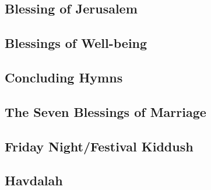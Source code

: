 ﻿\documentclass[a5paper, 12pt]{Birchon}
\begin{document}
\begin{english}
\subsection*{Blessing of Jerusalem}
\end{english}

\begin{english}
\subsection*{Blessings of Well-being}
\end{english}

\begin{english}
\subsection*{Concluding Hymns}
\end{english}

\eject

\begin{english}
\subsection*{The Seven Blessings of Marriage}
\end{english}

\eject

\begin{english}
\section*{Friday Night/Festival Kiddush}
\end{english}

\eject

\begin{english}
\section*{Havdalah}
\end{english}

\eject
\end{document}
